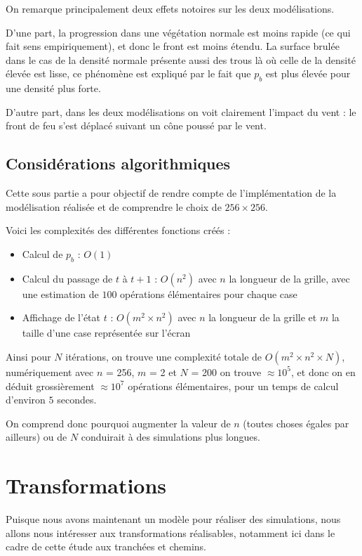 \documentclass[12pt]{article}
\begin{document}
On remarque principalement deux effets notoires sur les deux modélisations.

D'une part, la progression dans une végétation normale est moins rapide (ce qui fait sens empiriquement), et donc le front est moins étendu. La surface brulée dans le cas de la densité normale présente aussi des trous là où celle de la densité élevée est lisse, ce phénomène est expliqué par le fait que $p_b$ est plus élevée pour une densité plus forte.

D'autre part, dans les deux modélisations on voit clairement l'impact du vent : le front de feu s'est déplacé suivant un cône poussé par le vent.

\subsection{Considérations algorithmiques}

Cette sous partie a pour objectif de rendre compte de l'implémentation de la modélisation réalisée et de comprendre le choix de $256 \times 256$.

Voici les complexités des différentes fonctions créés :

\begin{itemize}
    \item Calcul de $p_b$ : $O(1)$
    \item Calcul du passage de $t$ à $t+1$ : $O(n^2)$ avec $n$ la longueur de la grille, avec une estimation de $100$ opérations élémentaires pour chaque case
    \item Affichage de l'état $t$ : $O(m^2 \times n^2)$ avec $n$ la longueur de la grille et $m$ la taille d'une case représentée sur l'écran
\end{itemize}

Ainsi pour $N$ itérations, on trouve une complexité totale de $O(m^2 \times n^2 \times N)$, numériquement avec $n$ = 256, $m$ = 2 et $N$ = 200 on trouve $\approx 10^5$, et donc on en déduit grossièrement $\approx 10^7$ opérations élémentaires, pour un temps de calcul d'environ $5$ secondes.

On comprend donc pourquoi augmenter la valeur de $n$ (toutes choses égales par ailleurs) ou de $N$ conduirait à des simulations plus longues.

\section{Transformations}

Puisque nous avons maintenant un modèle pour réaliser des simulations, nous allons nous intéresser aux transformations réalisables, notamment ici dans le cadre de cette étude aux tranchées et chemins.
\end{document}
